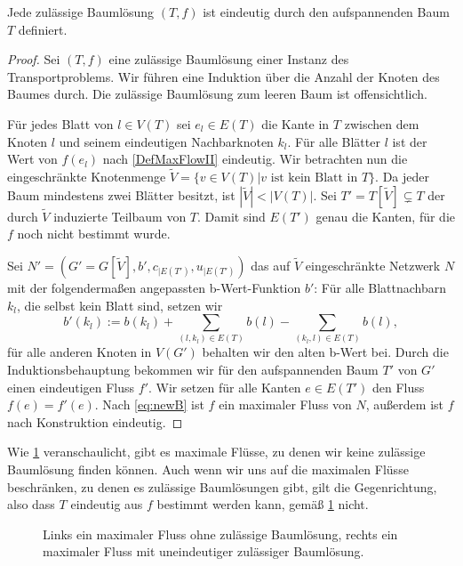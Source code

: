 \begin{lem}\label{TreeUnique}Jede zulässige Baumlösung $(T,f)$ ist eindeutig durch den aufspannenden Baum $T$ definiert.\end{lem}
\begin{proof}Sei $(T,f)$ eine zulässige Baumlösung einer Instanz des Transportproblems. Wir führen eine Induktion über die Anzahl der Knoten des Baumes durch. Die zulässige Baumlösung zum leeren Baum ist offensichtlich.

Für jedes Blatt von $l\in V(T)$ sei $e_l\in E(T)$ die Kante in $T$ zwischen dem Knoten $l$ und seinem eindeutigen Nachbarknoten $k_l$. Für alle Blätter $l$ ist der Wert von $f(e_l)$ nach \cref{DefMaxFlowII} eindeutig. Wir betrachten nun die eingeschränkte Knotenmenge $\tilde{V}=\{v\in V(T)|v\text{ ist kein Blatt in }T\}$. Da jeder Baum mindestens zwei Blätter besitzt, ist $|\tilde{V}|<|V(T)|$. Sei $T'=T[\tilde{V}]\subsetneq T$ der durch $\tilde{V}$ induzierte Teilbaum von $T$. Damit sind $E(T')$ genau die Kanten, für die $f$ noch nicht bestimmt wurde.

Sei $N'=(G'=G[\tilde{V}],b',c_{|E(T')},u_{|E(T')})$ das auf $\tilde{V}$ eingeschränkte Netzwerk $N$ mit der folgendermaßen angepassten b-Wert-Funktion $b'$: Für alle Blattnachbarn $k_l$, die selbst kein Blatt sind, setzen wir
\begin{equation}\label{eq:newB}
b'(k_l):=b(k_l)+\sum_{(l,k_l)\in E(T)} b(l)-\sum_{(k_l,l)\in E(T)} b(l),\end{equation}
für alle anderen Knoten in $V(G')$ behalten wir den alten b-Wert bei. Durch die Induktionsbehauptung bekommen wir für den aufspannenden Baum $T'$ von $G'$ einen eindeutigen Fluss $f'$. Wir setzen für alle Kanten $e\in E(T')$ den Fluss $f(e)=f'(e)$. Nach \cref{eq:newB} ist $f$ ein maximaler Fluss von $N$, außerdem ist $f$ nach Konstruktion eindeutig.\end{proof}

Wie \cref{fig:BL} veranschaulicht, gibt es maximale Flüsse, zu denen wir keine zulässige Baumlösung finden können. Auch wenn wir uns auf die maximalen Flüsse beschränken, zu denen es zulässige Baumlösungen gibt, gilt die Gegenrichtung, also dass $T$ eindeutig aus $f$ bestimmt werden kann, gemäß \cref{fig:BL} nicht.

\begin{figure}[!ht]\centering

\caption{Links ein maximaler Fluss ohne zulässige Baumlösung, rechts ein maximaler Fluss mit uneindeutiger zulässiger Baumlösung.}
\label{fig:BL}
\end{figure}	

